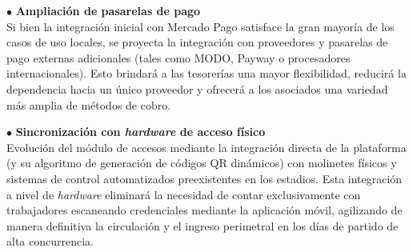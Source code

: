 \vspace{0.3cm}

\noindent $\bullet$ \textbf{Ampliación de pasarelas de pago}\\
Si bien la integración inicial con Mercado Pago satisface la gran mayoría de los casos de uso locales, se proyecta la integración con proveedores y pasarelas de pago externas adicionales (tales como MODO, Payway o procesadores internacionales). Esto brindará a las tesorerías una mayor flexibilidad, reducirá la dependencia hacia un único proveedor y ofrecerá a los asociados una variedad más amplia de métodos de cobro.

\vspace{0.3cm}

\noindent $\bullet$ \textbf{Sincronización con \textit{hardware} de acceso físico}\\
Evolución del módulo de accesos mediante la integración directa de la plataforma (y su algoritmo de generación de códigos QR dinámicos) con molinetes físicos y sistemas de control automatizados preexistentes en los estadios. Esta integración a nivel de \textit{hardware} eliminará la necesidad de contar exclusivamente con trabajadores escaneando credenciales mediante la aplicación móvil, agilizando de manera definitiva la circulación y el ingreso perimetral en los días de partido de alta concurrencia.
